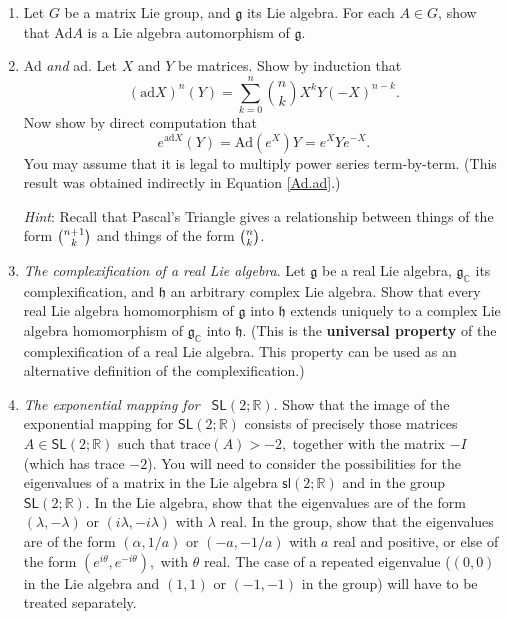 \documentclass{amsbook}
\let \frak = \mathfrak
\theoremstyle{plain}
\numberwithin{equation}{chapter}
\numberwithin{theorem}{chapter}
\begin{document}
\begin{enumerate}
\item  Let $G$ be a matrix Lie group, and $\frak{g}$ its Lie algebra. For each
$A\in G$, show that $\mathrm{Ad}A$ is a Lie algebra automorphism of $\frak{g}$.

\item \label{ad.expand}Ad \textit{and} ad. Let $X$ and $Y$ be matrices. Show
by induction that
\[
\left(  \mathrm{ad}X\right)  ^{n}(Y)=\sum_{k=0}^{n}\binom{n}{k}X^{k}%
Y(-X)^{n-k}\text{.}%
\]
Now show by direct computation that
\[
e^{\mathrm{ad}X}(Y)=\mathrm{Ad}(e^{X})Y=e^{X}Ye^{-X}\text{.}%
\]
You may assume that it is legal to multiply power series term-by-term. (This
result was obtained indirectly in Equation \ref{Ad.ad}.)

\textit{Hint}: Recall that Pascal's Triangle gives a relationship between
things of the form $\tbinom{n+1}{k}$ and things of the form $\tbinom{n}{k}$.

\item \label{extend.lie.homo}\textit{The complexification of a real Lie
algebra}. Let $\frak{g}$ be a real Lie algebra, $\frak{g}_{\mathbb{C}}$ its
complexification, and $\frak{h}$ an arbitrary complex Lie algebra. Show that
every real Lie algebra homomorphism of $\frak{g}$ into $\frak{h}$ extends
uniquely to a complex Lie algebra homomorphism of $\frak{g}_{\mathbb{C}}$ into
$\frak{h}$. (This is the \textbf{universal property} of the complexification
of a real Lie algebra. This property can be used as an alternative definition
of the complexification.)

\item \label{exp.sl2}\textit{The exponential mapping for}\emph{\ }%
$\mathsf{SL}\left(  2;\mathbb{R}\right)  $. Show that the image of the
exponential mapping for $\mathsf{SL}\left(  2;\mathbb{R}\right)  $ consists of
precisely those matrices $A\in\mathsf{SL}\left(  2;\mathbb{R}\right)  $ such
that $\mathrm{trace}\left(  A\right)  >-2,$ together with the matrix $-I$
(which has trace $-2$). You will need to consider the possibilities for the
eigenvalues of a matrix in the Lie algebra $\mathsf{sl}\left(  2;\mathbb{R}%
\right)  $ and in the group $\mathsf{SL}\left(  2;\mathbb{R}\right)  $. In the
Lie algebra, show that the eigenvalues are of the form $\left(  \lambda
,-\lambda\right)  $ or $\left(  i\lambda,-i\lambda\right)  $ with $\lambda$
real. In the group, show that the eigenvalues are of the form $\left(
\alpha,1/a\right)  $ or $\left(  -a,-1/a\right)  $ with $a$ real and positive,
or else of the form $\left(  e^{i\theta},e^{-i\theta}\right)  ,$ with $\theta$
real. The case of a repeated eigenvalue ($\left(  0,0\right)  $ in the Lie
algebra and $\left(  1,1\right)  $ or $\left(  -1,-1\right)  $ in the group)
will have to be treated separately.


\end{enumerate}
\end{document}
